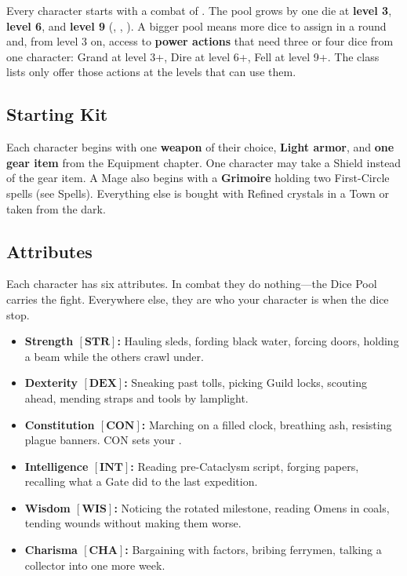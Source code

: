 Every character starts with a combat  of . The pool grows by one die at \textbf{level 3}, \textbf{level 6}, and \textbf{level 9} (, , ). A bigger pool means more dice to assign in a round and, from level 3 on, access to \textbf{power actions} that need three or four dice from one character: Grand \grand{} at level 3+, Dire \dire{} at level 6+, Fell \fell{} at level 9+. The class lists only offer those actions at the levels that can use them.

\subsection{Starting Kit}

Each character begins with one \textbf{weapon} of their choice, \textbf{Light armor}, and \textbf{one gear item} from the Equipment chapter. One character may take a Shield instead of the gear item. A Mage also begins with a \textbf{Grimoire} holding two First-Circle spells (see Spells). Everything else is bought with Refined crystals in a Town or taken from the dark.

\subsection{Attributes}

Each character has six attributes. In combat they do nothing---the Dice Pool carries the fight. Everywhere else, they are who your character is when the dice stop.

\begin{itemize}
    \item \textbf{Strength $\left[\textbf{STR}\right]$:} Hauling sleds, fording black water, forcing doors, holding a beam while the others crawl under.
    \item \textbf{Dexterity $\left[\textbf{DEX}\right]$:} Sneaking past tolls, picking Guild locks, scouting ahead, mending straps and tools by lamplight.
    \item \textbf{Constitution $\left[\textbf{CON}\right]$:} Marching on a filled clock, breathing ash, resisting plague banners. CON sets your .
    \item \textbf{Intelligence $\left[\textbf{INT}\right]$:} Reading pre-Cataclysm script, forging papers, recalling what a Gate did to the last expedition.
    \item \textbf{Wisdom $\left[\textbf{WIS}\right]$:} Noticing the rotated milestone, reading Omens in coals, tending wounds without making them worse.
    \item \textbf{Charisma $\left[\textbf{CHA}\right]$:} Bargaining with factors, bribing ferrymen, talking a collector into one more week.
\end{itemize}

